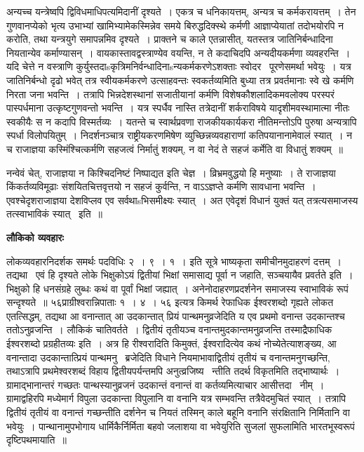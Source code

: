 \documentclass[11pt, openany]{book}
\begin{document}
अन्यच्च यन्त्रेष्वपि द्विविधमाधिपत्यमिदानीं दृश्यते~। एकत्र च धनिकायत्तम्, अन्यत्र च कर्मकरायत्तम्~। तेन गुणवानप्येको भृत्य उभाभ्यां खामिभ्यामेकस्मिन्नेव समये बिरुद्धदिक्स्थे कर्मणी आज्ञाप्येयातां तदोभयोरपि न करोति, तथा यन्त्रयुगे समापन्नमिव दृश्यते~। प्राक्तने च काले एतन्नासीत्, यतस्तत्र जातिनिर्बन्धादिना नियतान्येव कर्माण्यासन्~। वायकास्तावद्वस्त्राण्येव वयन्ति, न ते कदाचिदपि अन्यदीयकर्मणा व्यवहरन्ति~। यदि चेत्ते न वस्त्राणि कुर्युस्तदाsकृत्रिमनिर्वन्धादिनाsन्यकर्मकरणेऽशक्ताः स्वोदर \textendash\ पूरणेसमर्था भवेयुः~। यत्र जातिनिर्बन्धो दृढो भवेत् तत्र स्वीयकर्मकरणे उत्साहवन्तः स्वकर्तव्यमिति बुध्या तत्र प्रवर्तमानाः स्वे खे कर्मणि निरता जना भवन्ति~। तत्रापि भिन्नदेशस्थानां सजातीयानां कर्मणि विशेषकौशलादिकमवलोक्य परस्परं पास्पर्धमाना उत्कृष्टगुणवन्तो भवन्ति~। यत्र स्पर्धैव नास्ति तत्रेदानीं शर्कराविषये यादृशीमवस्थामात्मा नीतः स्वकीयैः स न कदापि विस्मर्तव्यः~। यतन्ते च स्वार्थप्रवणा राजकीयकार्यकरा नीतिमन्त्तोऽपि पुरुषा अन्यत्रापि स्पर्धा विलोपयितुम्~। निदर्शनञ्चात्र राष्ट्रीयकरणमिषेण व्युच्छिन्नव्यवहाराणां कतिपयानानामेवालं स्यात्~। न च राजाज्ञया कस्मिंश्चित्कर्मणि सहजत्वं निर्मातुं शक्यम्, न वा नेदं ते सहजं कर्मेति वा विधातुं शक्यम्~॥

\newpage

नन्वेवं चेत्, राजाज्ञया न किश्चिदनिष्टं निष्पाद्यत इति चेज्ञ~। व्रिभ्रमवुद्धयो हि मनुष्याः~। ते राजाज्ञया किंकर्तव्यविमूढाः संशयितचित्तवृत्तयो न सहजं कुर्वन्ति, न वाऽऽज्ञप्ते कर्मणि सावधाना भवन्ति~। एवश्चेदृशराजाज्ञया देशविप्लव एव सर्वथाsभिसमीक्ष्यः स्यात्~। अत एवेदृशं विधानं युक्तं यत् तत्रत्यसमाजस्य तत्स्वाभाविकं स्यात् \textendash\ इति~॥

\begin{center}
\textbf{\Large लौकिको व्यवहारः \textendash\ }
\end{center}

लोकव्यवहारनिदर्शक समर्थः पदविधिः २~। ९~। १~। इति सूत्रे भाष्यकृता समीचीनमुदाहरणं दत्तम्~। तद्यथा \textendash\ {\qt एवं हि दृश्यते लोके भिक्षुकोऽयं द्वितीयां भिक्षां समासाद्य पूर्वा न जहाति, सञ्चयायैव प्रवर्तते} इति~। भिक्षुको हि धनसंग्रहे लुब्धः कथं वा पूर्वां भिक्षां जह्यात्~। अनेनोदाहरणप्रदर्शनेन समाजस्य स्वाभाविकं रूपं सन्दृश्यते~॥ ५६प्राग्रीश्वरान्निपाताः १~। ४~। ५६ इत्यत्र किमर्थ रेफाधिक ईश्वरशब्दो गृह्यते लोकत एतत्सिद्धम्, तद्यथा आ वनान्तात् आ उदकान्तात् प्रियं पान्थमनुव्रजेदिति य एव प्रथमो वनान्त उदकान्तश्च ततोऽनुव्रजन्ति~। लौकिकं चातिवर्तते~। द्वितीयं तृतीयञ्च वनान्तमुदकान्तमनुव्रजन्ति तस्माद्रैफाधिक ईश्वरशब्दो प्रग्रहीतव्यः इति~। अत्र हि रीश्वरादिति किमुक्तं, ईश्वरादित्येव कथं नोच्येतेत्याशङ्ख्य, आ वनान्तादा उदकान्तात्प्रियं पान्थमनु \textendash\ ब्रजेदिति विधाने नियमाभावाद्वितीयं तृतीयं च वनान्तमनुगच्छन्ति, तथाऽत्रापि प्रथमेश्वरशब्दं विहाय द्वितीयपर्यन्तमपि अनुत्व्रजिष्य \textendash\ न्तीति तदर्थ विकृतमिति तद्भाष्यार्थः~। ग्रामाद्भानान्तरं गच्छतः पान्थस्यानुव्रजनं उदकान्तं वनान्तं वा कर्तव्यमित्याचार आसीत्तदा \textendash\ नीम्~। ग्रामाद्वहिरपि मध्येमार्ग विपुला उदकान्ता विपुलानि वा वनानि यत्र सम्भवन्ति तत्रैवेदमुचितं स्यात्~। तत्रापि द्वितीयं तृतीयं वा वनान्तं गच्छन्तीति दर्शनेन च नियतं तस्मिन् काले बहूनि वनानि संरक्षितानि निर्मितानि वा भवेयुः~। पान्थानामुपभोगाय धार्मिकैर्निर्मिता बहवो जलाशया वा भवेयुरिति सुजलां सुफलामिति भारतभूस्वरूपं दृष्टिपथमायाति~॥\\
\end{document}
